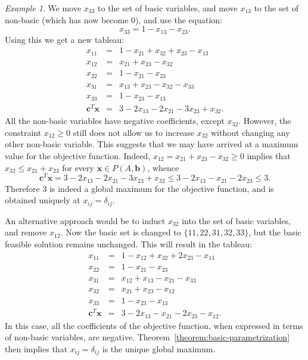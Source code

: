 \documentclass{amsbook}
\newcommand{\xx}{\mathbf x}
\newcommand{\cc}{\mathbf c}
\newcommand{\bb}{\mathbf b}
\theoremstyle{definition}
\theoremstyle{remark}
\newtheorem{example}[theorem]{Example}
\begin{document}
\begin{example}
  We move $x_{33}$ to the set of basic variables, and move $x_{13}$ to the set of non-basic (which has now become $0$), and use the equation:
  \begin{displaymath}
    x_{33}=1-x_{13}-x_{23}.
  \end{displaymath}
  Using this we get a new tableau:
  \begin{displaymath}
    \begin{matrix}
      x_{11} & = & 1-x_{21} +x_{32}+x_{23}-x_{13}\\
      x_{12} & = & x_{21}+x_{23}-x_{32}\\
      x_{22} & = & 1-x_{21} -x_{23}\\
      x_{31} & = & x_{13}+x_{23}-x_{32}-x_{33}\\
      x_{33} & = & 1-x_{23}-x_{13}\\
      \hline
      \cc^T\xx & = & 3-2x_{13}-2x_{21}-3x_{23}+x_{32}.
    \end{matrix}
  \end{displaymath}
  All the non-basic variables have negative coefficients, except $x_{32}$.
  However, the constraint $x_{12}\geq 0$ still does not allow us to increase $x_{32}$ without changing any other non-basic variable.
  This suggests that we may have arrived at a maximum value for the objective function.
  Indeed, $x_{12}=x_{21}+x_{23}-x_{32}\geq 0$ implies that $x_{32}\leq x_{21}+x_{23}$ for every $\xx\in P(A,\bb)$, whence
  \begin{displaymath}
    \cc^T\xx=3-2x_{13}-2x_{21}-3x_{23}+x_{32}\leq 3-2x_{13}-x_{21}-2x_{23}\leq 3.
  \end{displaymath}
  Therefore $3$ is indeed a global maximum for the objective function, and is obtained uniquely at $x_{ij}=\delta_{ij}$.

  An alternative approach would be to induct $x_{32}$ into the set of basic variables, and remove $x_{12}$.
  Now the basic set is changed to $\{11,22,31,32,33\}$, but the basic feasible solution remains unchanged.
  This will result in the tableau:
  \begin{displaymath}
    \begin{matrix}
      x_{11} & = & 1-x_{12}+x_{32}+2x_{23}-x_{13}\\
      x_{22} & = & 1-x_{21} -x_{23}\\
      x_{31} & = & x_{12}+x_{13}-x_{21}-x_{33}\\
      x_{32} & = & x_{21}+x_{23}-x_{12}\\
      x_{33} & = & 1-x_{23}-x_{13}\\
      \hline
      \cc^T\xx & = & 3-2x_{13}-x_{21}-2x_{23}-x_{12}.
    \end{matrix}
  \end{displaymath}
  In this case, all the coefficients of the objective function, when expressed in terms of non-basic variables, are negative.
  Theorem~\ref{theorem:basic-parametrization} then implies that $x_{ij}=\delta_{ij}$ is the unique global maximum.
\end{example}
\end{document}
